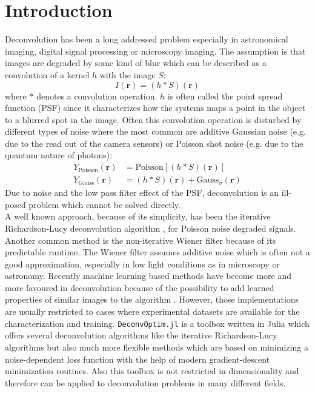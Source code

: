 \documentclass{juliacon}
\begin{document}
\section{Introduction}
Deconvolution has been a long addressed problem especially in astronomical imaging, digital signal processing or microscopy imaging.
The assumption is that images are degraded by some kind of blur which can be described as a convolution of a kernel $h$ with the image $S$:
\begin{equation}
    I(\mathbf r) = (h * S)(\mathbf r)
\end{equation}
where $*$ denotes a convolution operation.
$h$ is often called the point spread function (PSF) since it characterizes how the systems maps a point in the object to a blurred spot 
in the image.
Often this convolution operation is disturbed by different types of noise where the most common are additive Gaussian noise (e.g. due to the read out of the camera sensors) or Poisson shot noise (e.g. due to the quantum nature of photons):
\begin{align}
    Y_{\text{Poisson}}(\mathbf r) &= \text{Poisson}[(h * S)(\mathbf r)]\\
    Y_{\text{Gauss}}(\mathbf r) &= (h * S)(\mathbf r) + \text{Gauss}_{\sigma}(\mathbf r)
\end{align}
Due to noise and the low pass filter effect of the PSF, deconvolution is an ill-posed problem which cannot be solved directly.\\
A well known approach, because of its simplicity, has been the iterative Richardson-Lucy deconvolution algorithm \cite{Richardson:72}, \cite{lucy:74} for Poisson noise degraded signals.
Another common method is the non-iterative Wiener filter \cite{wiener2013extrapolation} because of its predictable runtime.
The Wiener filter assumes additive noise which is often not a good approximation, especially in low light conditions as in microscopy or astronomy. 
Recently machine learning based methods have become more and more favoured in deconvolution because
of the possibility to add learned properties of similar images to the algorithm \cite{Kruse_2017_ICCV}.
However, those implementations are usually restricted to cases where experimental datasets are available for the characterization and training.
\verb|DeconvOptim.jl| is a toolbox written in Julia \cite{bezanson2017julia} which offers several deconvolution algorithms like the iterative Richardson-Lucy algorithms but also
much more flexible methods which are based on minimizing a 
noise-dependent loss function with the help of modern gradient-descent minimization routines. 
Also this toolbox is not restricted in dimensionality and therefore can be applied to deconvolution problems in many different fields.
\end{document}
